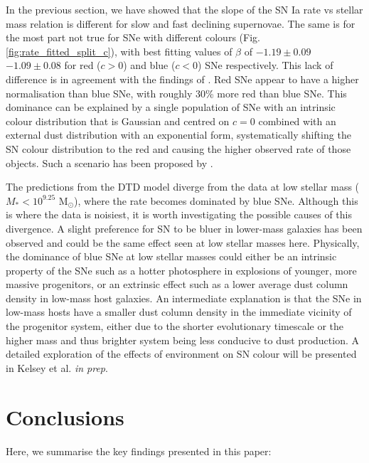 \documentclass[fleqn,usenatbib]{mnras}
\begin{document}
In the previous section, we have showed that the slope of the SN Ia rate vs stellar mass relation is different for slow and fast declining supernovae. The same is for the most part not true for SNe with different colours (Fig. \ref{fig:rate_fitted_split_c}), with best fitting values of $\beta$ of $-1.19\pm0.09$ $-1.09\pm0.08$ for red ($c > 0$) and blue ($c<0$) SNe respectively. This lack of difference is in agreement with the findings of \citet{Sullivan2010}. Red SNe appear to have a higher normalisation than blue SNe, with roughly 30\% more red than blue SNe. This dominance can be explained by a single population of SNe with an intrinsic colour distribution that is Gaussian and centred on $c=0$ combined with an external dust distribution with an exponential form, systematically shifting the SN colour distribution to the red and causing the higher observed rate of those objects. Such a scenario has been proposed by \citet{Brout2020}. 

The predictions from the DTD model diverge from the data at low stellar mass ($M_* <10^{9.25}$ M$_{\odot}$), where the rate becomes dominated by blue SNe. Although this is where the data is noisiest, it is worth investigating the possible causes of this divergence. A slight preference for SN to be bluer in lower-mass galaxies has been observed \citep{Scolnic2018,Brout2019,Smith2020,Kelsey2020} and could be the same effect seen at low stellar masses here. Physically, the dominance of blue SNe at low stellar masses could either be an intrinsic property of the SNe such as a hotter photosphere in explosions of younger, more massive progenitors, or an extrinsic effect such as a lower average dust column density in low-mass host galaxies. An intermediate explanation is that the SNe in low-mass hosts have a smaller dust column density in the immediate vicinity of the progenitor system, either due to the shorter evolutionary timescale or the higher mass and thus brighter system being less conducive to dust production. A detailed exploration of the effects of environment on SN colour will be presented in Kelsey et al. \textit{in prep}.

\section{Conclusions}
\label{sec:conclusion}

Here, we summarise the key findings presented in this paper:
\end{document}
